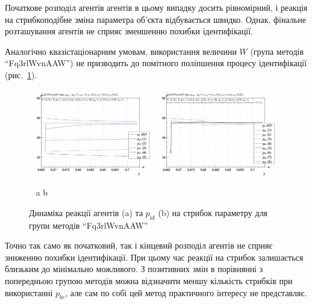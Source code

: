 Початкове розподіл агентів агентів в цьому випадку досить
рівномірний, і реакція на стрибкоподібне зміна параметра об'єкта
відбувається швидко. Однак, фінальне розташування агентів не
сприяє зменшенню похибки ідентифікації.

Аналогічно квазістаціонарним умовам, використання величини
$ W $ (група методів ``Fq3rlWvnAAW'') не призводить до помітного
поліпшення процесу ідентифікації (рис.~\ref{atu:f:Fq3rlWvnAAW_sign}).

\begin{figure}[htb!]
  \begin{center}
    \includegraphics[width=0.48\textwidth]{p/sign/qls-p_t_pi_m_Fq3rlWvnAAW_sign.png}
    \hfill
    \includegraphics[width=0.48\textwidth]{p/sign/qls-p_t_p_m_Fq3rlWvnAAW_sign.png}
  \end{center}
  \vspace{-1.0ex}
  \begin{center}
    ~ \hfill a \hfill\hfill b  \hfill ~
  \end{center}
  \vspace{-1.5ex}
  \caption{Динаміка реакції агентів (a) та $p_\mathrm{id}$ (b) на стрибок параметру для групи методів ``Fq3rlWvnAAW''}
  \label{atu:f:Fq3rlWvnAAW_sign}
\end{figure}

Точно так само як початковий, так і кінцевий розподіл агентів не
сприяє зниженню похибки ідентифікації. При цьому час реакції
на стрибок залишається близьким до мінімально можливого. З
позитивних змін в порівнянні з попередньою групою методів
можна відзначити меншу кількість стрибків при використанні
$ p_{bc} $, але сам по собі цей метод практичного інтересу не
представляє.


